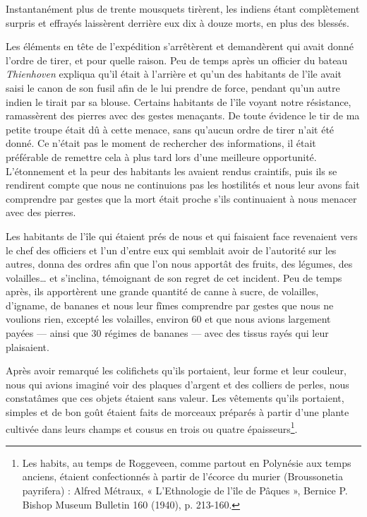 \documentclass{article}
\begin{document}
        
    Instantanément plus de trente mousquets tirèrent, les indiens étant complètement surpris et effrayés laissèrent derrière eux dix à douze morts, en plus des blessés.
            
        
    Les éléments en tête de l'expédition s'arrêtèrent et demandèrent qui avait donné l'ordre de tirer, et pour quelle raison. Peu de temps après un officier du bateau \textit{Thienhoven} expliqua qu'il était à l'arrière et qu'un des habitants de l'île avait saisi le canon de son fusil afin de le lui prendre de force, pendant qu'un autre indien le tirait par sa blouse. Certains habitants de l'île voyant notre résistance, ramassèrent des pierres avec des gestes menaçants. De toute évidence le tir de ma petite troupe était dû à cette menace, sans qu'aucun ordre de tirer n'ait été donné. Ce n'était pas le moment de rechercher des informations, il était préférable de remettre cela à plus tard lors d'une meilleure opportunité. L'étonnement et la peur des habitants les avaient rendus craintifs, puis ils se rendirent compte que nous ne continuions pas les hostilités et nous leur avons fait comprendre par gestes que la mort était proche s'ils continuaient à nous menacer avec des pierres.
            
        
    Les habitants de l'île qui étaient prés de nous et qui faisaient face revenaient vers le chef des officiers et l'un d'entre eux qui semblait avoir de l'autorité sur les autres, donna des ordres afin que l'on nous apportât des fruits, des légumes, des volailles… et s'inclina, témoignant de son regret de cet incident. Peu de temps après, ils apportèrent une grande quantité de canne à sucre, de volailles, d'igname, de bananes et nous leur fîmes comprendre par gestes que nous ne voulions rien, excepté les volailles, environ 60 et que nous avions largement payées — ainsi que 30 régimes de bananes — avec des tissus rayés qui leur plaisaient.
            
        
    Après avoir remarqué les colifichets qu'ils portaient, leur forme et leur couleur, nous qui avions imaginé voir des plaques d'argent et des colliers de perles, nous constatâmes que ces objets étaient sans valeur. Les vêtements qu'ils portaient, simples et de bon goût étaient faits de morceaux préparés à partir d'une plante cultivée dans leurs champs et cousus en trois ou quatre épaisseurs\footnote{Les habits, au temps de Roggeveen, comme partout en Polynésie aux temps anciens, étaient confectionnés à partir de l'écorce du murier (Broussonetia payrifera) : Alfred Métraux, « L'Ethnologie de l'île de Pâques », Bernice P. Bishop Museum Bulletin 160 (1940), p. 213-160.}.
            
\end{document}
